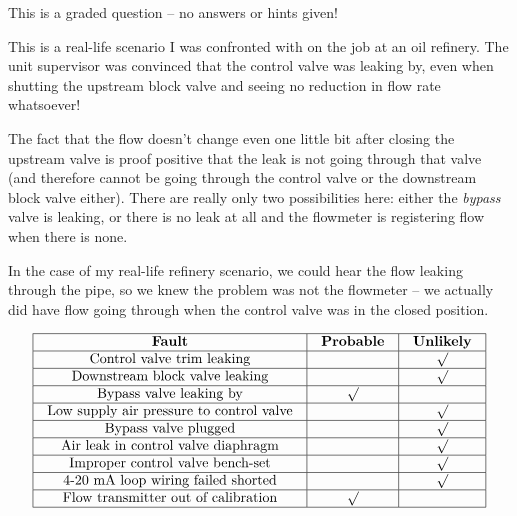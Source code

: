\vfil 

\eject






This is a graded question -- no answers or hints given!







This is a real-life scenario I was confronted with on the job at an oil refinery.  The unit supervisor was convinced that the control valve was leaking by, even when shutting the upstream block valve and seeing no reduction in flow rate whatsoever!

The fact that the flow doesn't change even one little bit after closing the upstream valve is proof positive that the leak is not going through that valve (and therefore cannot be going through the control valve or the downstream block valve either).  There are really only two possibilities here: either the {\it bypass} valve is leaking, or there is no leak at all and the flowmeter is registering flow when there is none.

In the case of my real-life refinery scenario, we could hear the flow leaking through the pipe, so we knew the problem was not the flowmeter -- we actually did have flow going through when the control valve was in the closed position.


$$\vbox{\offinterlineskip
\halign{\strut
\vrule \quad\hfil # \ \hfil & 
\vrule \quad\hfil # \ \hfil & 
\vrule \quad\hfil # \ \hfil \vrule \cr
\noalign{\hrule}
%
{\bf Fault} & {\bf Probable} & {\bf Unlikely} \cr
%
\noalign{\hrule}
%
Control valve trim leaking &  & $\surd$ \cr
%
\noalign{\hrule}
%
Downstream block valve leaking &  & $\surd$ \cr
%
\noalign{\hrule}
%
Bypass valve leaking by & $\surd$  & \cr
%
\noalign{\hrule}
%
Low supply air pressure to control valve &  & $\surd$ \cr
%
\noalign{\hrule}
%
Bypass valve plugged &  & $\surd$ \cr
%
\noalign{\hrule}
%
Air leak in control valve diaphragm &  & $\surd$ \cr
%
\noalign{\hrule}
%
Improper control valve bench-set &  & $\surd$ \cr
%
\noalign{\hrule}
%
4-20 mA loop wiring failed shorted &  & $\surd$ \cr
%
\noalign{\hrule}
%
Flow transmitter out of calibration & $\surd$  & \cr
%
\noalign{\hrule}
} %
}$$ %






